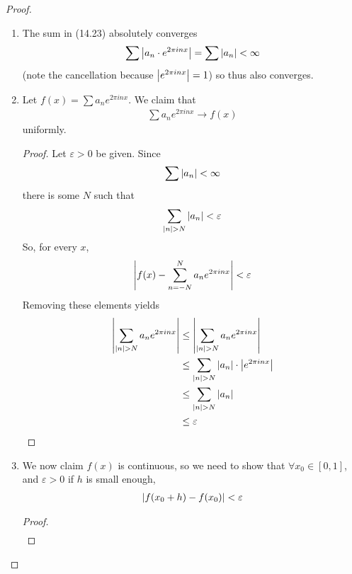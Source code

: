 \begin{proof}
    \begin{enumerate}
        \item The sum in (14.23) absolutely converges
        \begin{align}
            \sum \abs{a_n \cdot e^{2\pi in x}} = \sum \abs{a_n} <  \infty
        \end{align}
        (note the cancellation because $\abs{e^{2\pi in x}} = 1$) so thus also converges.
        \item Let $f(x) = \sum a_n e^{2\pi in x}$. We claim that
        \begin{align}
            \sum a_n e^{2\pi in x} \to f(x)
        \end{align}
        uniformly.
        \begin{proof}
            Let $\varepsilon > 0$ be given. Since
            \begin{align}
                \sum \abs{a_n} < \infty
            \end{align}
            there is some $N$ such that
            \begin{align}
                \sum_{\abs{n} > N} \abs{a_n} < \varepsilon
            \end{align}
            So, for every $x$,
            \begin{align}
                \abs{f(x) - \sum_{n = -N}^N a_n e^{2\pi in x}} < \varepsilon
            \end{align}
            Removing these elements yields
            \begin{align}
                \abs{\sum_{\abs{n}>N} a_n e^{2\pi in x}} &\le \abs{\sum_{\abs{n}>N} a_n e^{2\pi in x}}\\
                &\le \sum_{\abs{n}>N} \abs{a_n} \cdot \abs{{e^{2\pi in x}}}\\
                &\le \sum_{\abs{n}>N} \abs{a_n}\\
                &\le \varepsilon
            \end{align}
        \end{proof}
        \item We now claim $f(x)$ is continuous, so we need to show that $\forall x_0 \in [0, 1]$, and $\varepsilon > 0$ if $h$ is small enough,
        \begin{align}
            \abs{f(x_0 + h) - f(x_0)} < \varepsilon
        \end{align}
        \begin{proof}
            \begin{align}

\end{align}
\end{proof}
\end{enumerate}
\end{proof}
